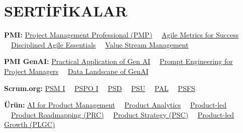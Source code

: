 \documentclass[10pt,letterpaper]{article}
\begin{document}
\section{SERTİFİKALAR}
\textbf{PMI:} \href{https://www.credly.com/badges/57c77063-0cef-4b7a-9dde-b9907b5479f8/public_url}{Project Management Professional (PMP)} \ \textbar\ \href{https://www.credly.com/badges/47d5fa0a-0374-4b0c-9532-802cbb0ec95e/public_url}{Agile Metrics for Success} \ \textbar\ \href{https://www.credly.com/badges/f86005f2-783c-48a1-94f6-801e37a1ce60/public_url}{Disciplined Agile Essentials} \ \textbar\ \href{https://www.credly.com/badges/829a1e46-0be7-42aa-a3c9-f036f5e6713f/public_url}{Value Stream Management}\par
\vspace{1pt}
\textbf{PMI GenAI:} \href{https://www.credly.com/badges/6753b402-a2eb-4240-8eae-220987d95a69/public_url}{Practical Application of Gen AI} \ \textbar\ \href{https://www.credly.com/badges/ba2e0800-a7a1-4d25-a135-5cd0107056bc/public_url}{Prompt Engineering for Project Managers} \ \textbar\ \href{https://www.credly.com/badges/d33adc1f-876f-4e54-b12f-80bba9fba461/public_url}{Data Landscape of GenAI}\par
\vspace{1pt}
\textbf{Scrum.org:} \href{https://www.credly.com/badges/d21135e4-80ee-4c03-be13-6611aff304b3/public_url}{PSM I} \ \textbar\ \href{https://www.credly.com/badges/b05ea15d-927c-4c55-a15c-d5eb6f04784f/public_url}{PSPO I} \ \textbar\ \href{https://www.credly.com/badges/3ea72efd-f83b-4dad-8e09-31ec845e9473/public_url}{PSD} \ \textbar\ \href{https://www.credly.com/badges/62e831e2-2006-430f-a6d8-d365347bf71a/public_url}{PSU} \ \textbar\ \href{https://www.credly.com/badges/3706166e-aa69-4c0a-9e7e-8d84a6d2a81d/public_url}{PAL} \ \textbar\ \href{https://www.credly.com/badges/8542a9ff-cb8c-4d37-89bb-cadf8455ab17/public_url}{PSFS}\par
\vspace{1pt}
\textbf{Ürün:} \href{https://www.credly.com/badges/47d24682-6229-4e2f-aeeb-d5d517604f71/public_url}{AI for Product Management} \ \textbar\ \href{https://www.credly.com/badges/b31053b5-2114-41e6-a76c-b3acbdd12e3c/public_url}{Product Analytics} \ \textbar\ \href{https://www.credly.com/badges/1f2a65a5-caa9-4576-8ce1-76b6d3cb8f24/public_url}{Product-led} \ \textbar\ \href{https://berkayvuran.com/assets/appendices/prc.pdf}{Product Roadmapping (PRC)} \ \textbar\ \href{https://berkayvuran.com/assets/appendices/psc.pdf}{Product Strategy (PSC)} \ \textbar\ \href{https://berkayvuran.com/assets/appendices/plgc.pdf}{Product-led Growth (PLGC)}
\end{document}
